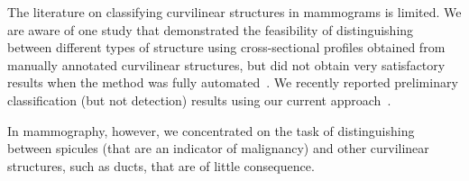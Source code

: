 The literature on classifying curvilinear structures in mammograms is limited. We are aware of one study that demonstrated the feasibility of distinguishing between different types of structure using cross-sectional profiles obtained from manually annotated curvilinear structures, but did not obtain very satisfactory results when the method was fully automated~\cite{Zwiggelaar_etal_TMI04}. We recently reported preliminary classification (but not detection) results using our current approach~\cite{Chen_etal_IWDM10}.

In mammography, however, we concentrated on the task of distinguishing between spicules (that are an indicator of malignancy) and other curvilinear structures, such as ducts, that are of little consequence.
